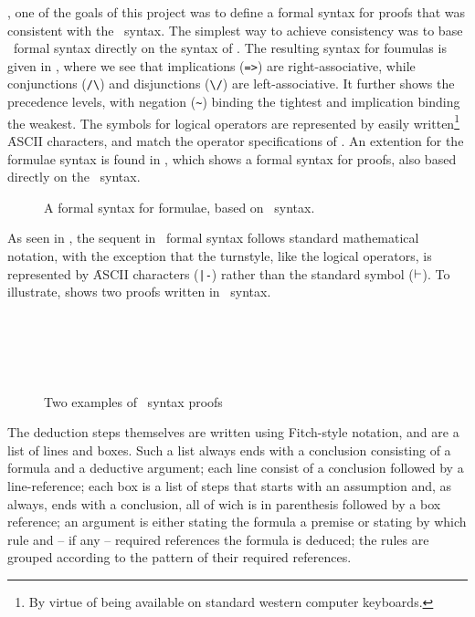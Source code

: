 \documentclass[BA.tex]{subfiles}
\begin{document}
\label{formsyn}
, one of the goals of this project
 was to define a formal syntax for proofs that was consistent with the
 \bp\ syntax\cite{boxhelp}. The simplest way to achieve consistency
 was to base \our\ formal syntax directly on the syntax of \bp.
 The resulting syntax for foumulas is given in , where we see
 that implications (\verb+=>+) are right-associative, while conjunctions 
 (\verb+/\+) and disjunctions (\verb+\/+) are left-associative. It further
 shows the precedence levels, with negation (\verb+~+) binding the tightest
 and implication binding the weakest. The symbols for logical operators are
 represented by easily written\footnote{By virtue of being available on 
 standard western computer keyboards.} \f{ASCII} characters, and match the
 operator specifications of \bp.
 An extention for the formulae syntax is found in , 
 which shows a formal
 syntax for proofs, also based directly on the \bp\ syntax.

\begin{figure}[t]

\caption[A {\bf formal} syntax for formulae]
{A formal syntax for formulae, based on \bp\ syntax.}
\label{fform}
\end{figure}

 As seen in , the sequent in \our\ formal syntax
 follows standard mathematical notation, with the exception that the
 turnstyle, like the  logical operators, is represented by
 \f{ASCII} characters (\verb+|-+) rather than the standard symbol 
 (\(\vdash\)). To illustrate,  shows two proofs
 written in \bp\ syntax.

\begin{figure}[!h]
\centering
\begin{subfigure}[t]{0.45\textwidth}
\scriptsize

~\\~\\~\\
\label{sf:exr}
\end{subfigure}
\(\quad\)
\begin{subfigure}[t]{0.45\textwidth}
\scriptsize

\label{sf:exq}
\end{subfigure}
\caption[]{Two examples of \bp\ syntax proofs}
\label{bpex}
\end{figure}
 
 The deduction steps themselves are written using 
 Fitch-style notation\cite{boxhelp},
 and are a list of lines and boxes. Such a list always ends with a 
 conclusion consisting of a formula
 and a deductive argument; each line consist of a conclusion followed 
 by a line-reference; each box is a list of steps that starts with an 
 assumption and, as always, ends with a conclusion, all of wich is in
 parenthesis followed by a box reference; an argument is either stating
 the formula a premise or stating by which rule and -- if any -- required 
 references the formula is deduced; the rules are grouped according to the
 pattern of their required references. 
 
\end{document}
